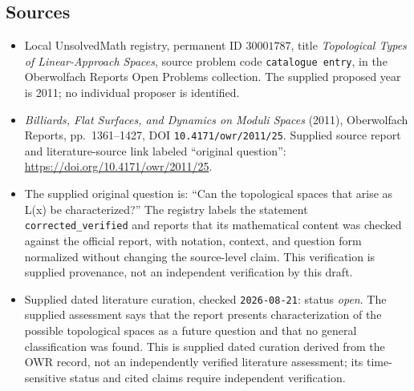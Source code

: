 \documentclass[11pt]{article}
\begin{document}
\subsection{Sources}
\begin{itemize}
\item Local UnsolvedMath registry, permanent ID \(30001787\), title \emph{Topological Types of Linear-Approach Spaces}, source problem code \texttt{catalogue entry}, in the Oberwolfach Reports Open Problems collection. The supplied proposed year is 2011; no individual proposer is identified.
\item \emph{Billiards, Flat Surfaces, and Dynamics on Moduli Spaces} (2011), Oberwolfach Reports, pp.\ 1361--1427, DOI \texttt{10.4171/owr/2011/25}. Supplied source report and literature-source link labeled ``original question'': \url{https://doi.org/10.4171/owr/2011/25}.
\item The supplied original question is: ``Can the topological spaces that arise as L(x) be characterized?'' The registry labels the statement \texttt{corrected\_verified} and reports that its mathematical content was checked against the official report, with notation, context, and question form normalized without changing the source-level claim. This verification is supplied provenance, not an independent verification by this draft.
\item Supplied dated literature curation, checked \texttt{2026-08-21}: status \emph{open}. The supplied assessment says that the report presents characterization of the possible topological spaces as a future question and that no general classification was found. This is supplied dated curation derived from the OWR record, not an independently verified literature assessment; its time-sensitive status and cited claims require independent verification.
\end{itemize}
\end{document}
